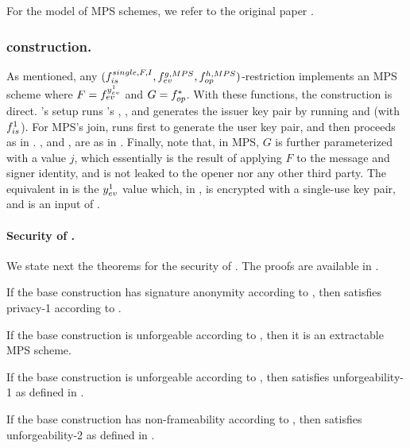 For the model of MPS schemes, we refer to the original paper \cite{ngsy22}.

\subsubsection{\CUASMPS construction.} %
As mentioned, any $(f_{is}^{single,F,I},f_{ev}^{g,MPS},
f_{op}^{h,MPS})$-restriction implements an MPS scheme where $F=f_{ev}^{y_{ev}^1}$
and $G=f_{op}^\ast$. With these functions, the construction is direct.
\CUASMPS's setup runs \CUASGen's \Setup, \OKeyGen, and generates the issuer key
pair by running \KeyGen and \ISet (with $f_{is}^1$). For MPS's join, \CUASMPS
runs first \KeyGen to generate the user key pair, and then proceeds as in
\CUASGen. \Sign, \Verify and \Open, are as in \CUASGen.
%
Finally, note that, in MPS, $G$ is further parameterized with a value $j$, which
essentially is the result of applying $F$ to the message and signer identity,
and is not leaked to the opener nor any other third party. The equivalent in
\UAS is the $y_{ev}^1$ value which, in \CUASGen, is encrypted with a single-use
key pair, and is an input of \finsp.

\paragraph{Security of \CUASMPS.} %
We state next the theorems for the security of \CUASMPS. The proofs are
available in .

\begin{theorem}
  If the base \CUASGen construction has signature anonymity according to
  , then \CUASMPS satisfies privacy-1
  according to \cite{ngsy22}.
\end{theorem}

\begin{theorem}
  If the base \CUASGen construction is unforgeable according to
  , then it is an extractable MPS scheme.
\end{theorem}

\begin{theorem}
  If the base \CUASGen construction is unforgeable according to
  , then \CUASMPS satisfies unforgeability-1 as
  defined in \cite{ngsy22}.
\end{theorem}

\begin{theorem}
  If the base \CUASGen construction has non-frameability according to
  , then \CUASMPS satisfies unforgeability-2 as
  defined in \cite{ngsy22}.
\end{theorem}


